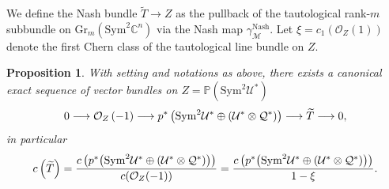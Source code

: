 \documentclass[11pt]{article}
\numberwithin{equation}{section}
\numberwithin{figure}{section}
\theoremstyle{plain}
\newtheorem{prop}[thm]{Proposition}
\theoremstyle{definition}
\theoremstyle{remark}
\newcommand{\Gr}{\mathrm{Gr}}
\newcommand{\Sym}{\mathrm{Sym}}
\begin{document}
We define the Nash bundle $\widetilde T \to Z$ as the pullback of the
tautological rank-$m$ subbundle on $\Gr_m(\Sym^2\mathbb C^n)$ via the
Nash map $\gamma_{\mathcal M}^{\mathrm{Nash}}$. Let $\xi = c_1(\mathcal O_Z(1))$ denote the first Chern class of the
tautological line bundle on $Z$. 

\begin{prop}\label{eq:ExactSequence}
   With setting and notations as above, there exists a canonical exact sequence
of vector bundles on $Z=\mathbb P\left(\Sym^2\mathcal U^\ast\right)$
\begin{equation}\label{eq:tag{4.2}}
0\longrightarrow \mathcal{O}_Z\left( -1\right)
\longrightarrow
p^\ast\left( \Sym^2\mathcal{U}^\ast\oplus\left( \mathcal{U}^\ast\otimes \mathcal{Q}^\ast\right)\right)
\longrightarrow
\widetilde T
\longrightarrow 0,
\end{equation}
in particular
\begin{equation}\label{eq:tag{4.3}}
c\left(\widetilde T\right) = \frac{ c \left(p^\ast\!\left(
\Sym^2\mathcal U^\ast \oplus (\mathcal U^\ast \otimes \mathcal Q^\ast)
\right)\right)}{c(\mathcal O_Z(-1))}
=
\frac{c\left(p^\ast\!\left(
\Sym^2\mathcal U^\ast \oplus (\mathcal U^\ast \otimes \mathcal Q^\ast)
\right)\right)}{1-\xi}.
\end{equation}
\end{prop}
\end{document}
